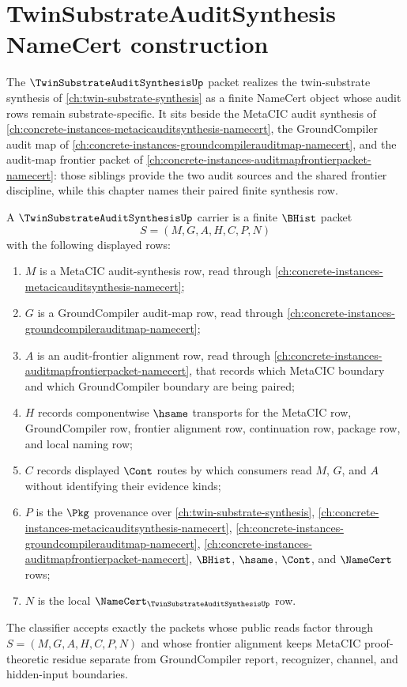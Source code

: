 \chapter{TwinSubstrateAuditSynthesis NameCert construction}
\label{ch:concrete-instances-twin-substrate-audit-synthesis-namecert}

The $\TwinSubstrateAuditSynthesisUp$ packet realizes the twin-substrate synthesis of \autoref{ch:twin-substrate-synthesis} as a finite NameCert object whose audit rows remain substrate-specific. It sits beside the MetaCIC audit synthesis of \autoref{ch:concrete-instances-metacicauditsynthesis-namecert}, the GroundCompiler audit map of \autoref{ch:concrete-instances-groundcompilerauditmap-namecert}, and the audit-map frontier packet of \autoref{ch:concrete-instances-auditmapfrontierpacket-namecert}: those siblings provide the two audit sources and the shared frontier discipline, while this chapter names their paired finite synthesis row.

\begin{definition}
\label{def:twin-substrate-audit-synthesis-carrier}
A $\TwinSubstrateAuditSynthesisUp$ carrier is a finite $\BHist$ packet
$$
S=(M,G,A,H,C,P,N)
$$
with the following displayed rows:
\begin{enumerate}
\item $M$ is a MetaCIC audit-synthesis row, read through \autoref{ch:concrete-instances-metacicauditsynthesis-namecert};
\item $G$ is a GroundCompiler audit-map row, read through \autoref{ch:concrete-instances-groundcompilerauditmap-namecert};
\item $A$ is an audit-frontier alignment row, read through \autoref{ch:concrete-instances-auditmapfrontierpacket-namecert}, that records which MetaCIC boundary and which GroundCompiler boundary are being paired;
\item $H$ records componentwise $\hsame$ transports for the MetaCIC row, GroundCompiler row, frontier alignment row, continuation row, package row, and local naming row;
\item $C$ records displayed $\Cont$ routes by which consumers read $M$, $G$, and $A$ without identifying their evidence kinds;
\item $P$ is the $\Pkg$ provenance over \autoref{ch:twin-substrate-synthesis}, \autoref{ch:concrete-instances-metacicauditsynthesis-namecert}, \autoref{ch:concrete-instances-groundcompilerauditmap-namecert}, \autoref{ch:concrete-instances-auditmapfrontierpacket-namecert}, $\BHist$, $\hsame$, $\Cont$, and $\NameCert$ rows;
\item $N$ is the local $\NameCert_{\TwinSubstrateAuditSynthesisUp}$ row.
\end{enumerate}
The classifier accepts exactly the packets whose public reads factor through $S=(M,G,A,H,C,P,N)$ and whose frontier alignment keeps MetaCIC proof-theoretic residue separate from GroundCompiler report, recognizer, channel, and hidden-input boundaries.
\end{definition}

